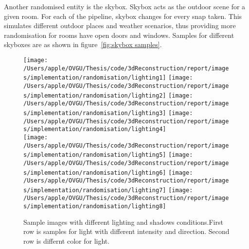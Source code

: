 Another randomised entity is the skybox.
Skybox acts as the outdoor scene for a given room.
For each of the pipeline, skybox changes for every snap taken.
This simulates different outdoor places and weather scenarios, thus providing more randomisation for rooms have open doors and windows.
Samples for different skyboxes are as shown in figure~\ref{fig:skybox samples}.


\begin{figure}
    \centering
        \texttt{[image: /Users/apple/OVGU/Thesis/code/3dReconstruction/report/images/implementation/randomisation/lighting1]}
        \texttt{[image: /Users/apple/OVGU/Thesis/code/3dReconstruction/report/images/implementation/randomisation/lighting2]}
        \texttt{[image: /Users/apple/OVGU/Thesis/code/3dReconstruction/report/images/implementation/randomisation/lighting3]}
        \texttt{[image: /Users/apple/OVGU/Thesis/code/3dReconstruction/report/images/implementation/randomisation/lighting4]}\\
    \vspace{0.1cm}
        \texttt{[image: /Users/apple/OVGU/Thesis/code/3dReconstruction/report/images/implementation/randomisation/lighting5]}
        \texttt{[image: /Users/apple/OVGU/Thesis/code/3dReconstruction/report/images/implementation/randomisation/lighting6]}
        \texttt{[image: /Users/apple/OVGU/Thesis/code/3dReconstruction/report/images/implementation/randomisation/lighting7]}
        \texttt{[image: /Users/apple/OVGU/Thesis/code/3dReconstruction/report/images/implementation/randomisation/lighting8]}\\
    \caption{Sample images with different lighting and shadows conditions.First row is samples for light with different intensity and direction. Second row is differnt color for light.}
    \label{fig:Lighting and shadows}
\end{figure}

